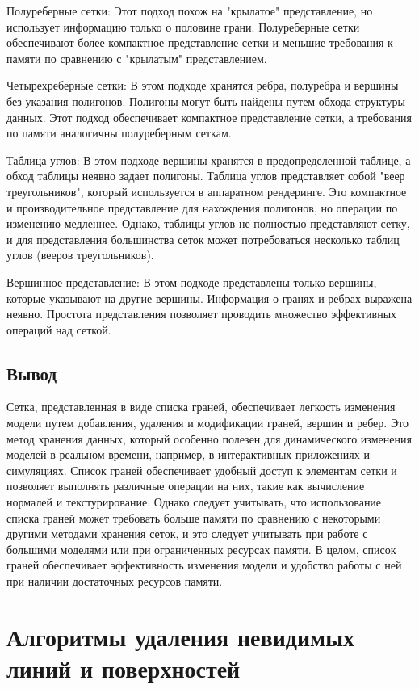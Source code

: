     Полуреберные сетки: Этот подход похож на "крылатое" представление, но использует информацию только о половине грани. Полуреберные сетки обеспечивают более компактное представление сетки и меньшие требования к памяти по сравнению с "крылатым" представлением.

    Четырехреберные сетки: В этом подходе хранятся ребра, полуребра и вершины без указания полигонов. Полигоны могут быть найдены путем обхода структуры данных. Этот подход обеспечивает компактное представление сетки, а требования по памяти аналогичны полуреберным сеткам.

    Таблица углов: В этом подходе вершины хранятся в предопределенной таблице, а обход таблицы неявно задает полигоны. Таблица углов представляет собой "веер треугольников", который используется в аппаратном рендеринге. Это компактное и производительное представление для нахождения полигонов, но операции по изменению медленнее. Однако, таблицы углов не полностью представляют сетку, и для представления большинства сеток может потребоваться несколько таблиц углов (вееров треугольников).

    Вершинное представление: В этом подходе представлены только вершины, которые указывают на другие вершины. Информация о гранях и ребрах выражена неявно. Простота представления позволяет проводить множество эффективных операций над сеткой.



\subsection{Вывод}

Сетка, представленная в виде списка граней, обеспечивает легкость изменения модели путем добавления, удаления и модификации граней, вершин и ребер. Это метод хранения данных, который особенно полезен для динамического изменения моделей в реальном времени, например, в интерактивных приложениях и симуляциях. Список граней обеспечивает удобный доступ к элементам сетки и позволяет выполнять различные операции на них, такие как вычисление нормалей и текстурирование. Однако следует учитывать, что использование списка граней может требовать больше памяти по сравнению с некоторыми другими методами хранения сеток, и это следует учитывать при работе с большими моделями или при ограниченных ресурсах памяти. В целом, список граней обеспечивает эффективность изменения модели и удобство работы с ней при наличии достаточных ресурсов памяти.

\section{Алгоритмы удаления невидимых линий и поверхностей}

